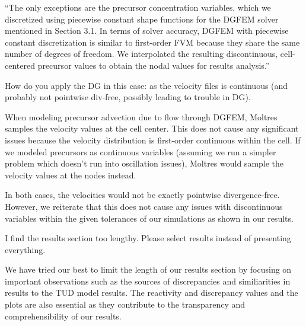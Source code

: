 \documentclass[answers,11pt]{exam}
\begin{document}
\begin{questions}
\begin{solution}
            ``The only exceptions are the precursor concentration variables,
which we discretized using piecewise constant shape functions for the 
\gls{DGFEM} solver mentioned in Section 3.1. In terms of solver accuracy,
\gls{DGFEM} with piecewise constant discretization is similar to first-order
\gls{FVM} because they share the same
number of degrees of freedom. We interpolated the resulting discontinuous,
cell-centered precursor values to obtain the nodal values for results
analysis.''
        \end{solution}

        \question How do you apply the DG in this case: as the
        velocity files is continuous (and probably not pointwise div-free,
        possibly leading to trouble in DG).
        \begin{solution}
            When modeling precursor advection due to flow through DGFEM,
            Moltres samples the velocity values at the cell center. This
            does not cause any significant issues because the velocity
            distribution is first-order continuous within the cell. If we
            modeled precursors as continuous variables (assuming we run a
            simpler problem which doesn't run into oscillation issues), Moltres
            would sample the velocity values at the nodes instead.
            
            In both cases, the velocities would not be exactly pointwise
            divergence-free. However, we reiterate that this does not cause
            any issues with discontinuous variables within the given tolerances
            of our simulations as shown in our results.
        \end{solution}
        \question I find the results section too lengthy. Please select results
        instead of presenting everything.
        \begin{solution}
        	We have tried our best to limit the length of our results section
        	by focusing on important observations such as the sources of
        	discrepancies and similiarities in results to the TUD model
        	results. The reactivity and discrepancy values and the plots are
        	also essential as they contribute to the transparency and
        	comprehensibility of our results.
        \end{solution}


\end{questions}
\end{document}
